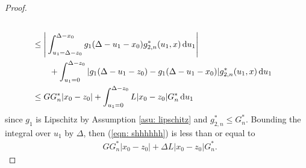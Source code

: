 \begin{proof}
\begin{align}
		\\\nonumber& \leq  \Bigg|\int_{u_1=\Delta-z_0}^{\Delta-x_0}g_1(\Delta - u_1 - x_0)g^*_{2,n}(u_1,x)\, \mathrm{d} u_1\Bigg|
		\\\nonumber &\qquad{} + \int_{u_1=0}^{\Delta-z_0}|g_1(\Delta - u_1 - z_0)-g_1(\Delta - u_1 - x_0)|g^*_{2,n}(u_1,x)\, \mathrm{d} u_1
		\\\label{eqn: shhhhhh}& \leq  GG^*_n|x_0-z_0|
		 + \int_{u_1=0}^{\Delta-z_0}L|x_0-z_0|G^*_n\, \mathrm{d} u_1
		 \end{align}
		{since \(g_1\) is Lipschitz by Assumption \ref{asu: lipschitz} and \(g_{2,n}^*\leq G_n^*\). Bounding the integral over \(u_1\) by \(\Delta\), then (\ref{eqn: shhhhhh}) is less than or equal to}
		\begin{align}
		&GG^*_n|x_0-z_0| + \Delta L|x_0-z_0|G^*_n.
	\end{align}
\end{proof}

